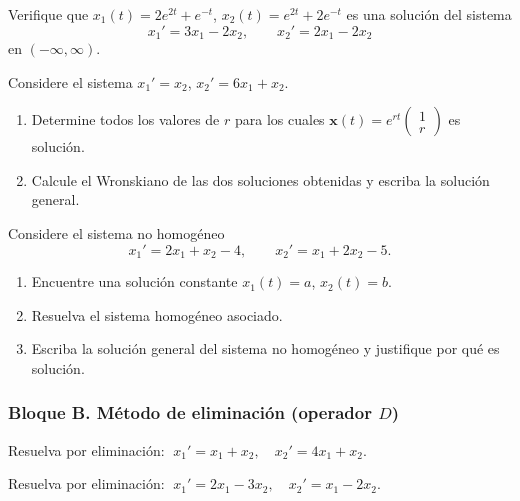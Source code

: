 \begin{exercise}[\est{1}]\label{ex:A2}
Verifique que $x_1(t) = 2e^{2t} + e^{-t}$, $x_2(t) = e^{2t} + 2e^{-t}$ es una solución del sistema
\[
x_1' = 3x_1 - 2x_2, \qquad x_2' = 2x_1 - 2x_2
\]
en $(-\infty,\infty)$.
\end{exercise}

\begin{exercise}[\est{2}]\label{ex:A3}
Considere el sistema $x_1' = x_2$, $x_2' = 6x_1 + x_2$.
\begin{enumerate}[a]
    \item Determine todos los valores de $r$ para los cuales $\mathbf{x}(t) = e^{rt}\begin{pmatrix}1\\ r\end{pmatrix}$ es solución.
    \item Calcule el Wronskiano de las dos soluciones obtenidas y escriba la solución general.
\end{enumerate}
\end{exercise}

\begin{exercise}[\est{2}]\label{ex:A4}
Considere el sistema no homogéneo
\[
x_1' = 2x_1 + x_2 - 4, \qquad x_2' = x_1 + 2x_2 - 5.
\]
\begin{enumerate}[a]
    \item Encuentre una solución constante $x_1(t)=a$, $x_2(t)=b$.
    \item Resuelva el sistema homogéneo asociado.
    \item Escriba la solución general del sistema no homogéneo y justifique por qué es solución.
\end{enumerate}
\end{exercise}

\subsubsection*{Bloque B. Método de eliminación (operador $D$)}

\begin{exercise}[\est{1}]\label{ex:B1}
Resuelva por eliminación: $\;x_1' = x_1 + x_2, \quad x_2' = 4x_1 + x_2.$
\end{exercise}

\begin{exercise}[\est{1}]\label{ex:B2}
Resuelva por eliminación: $\;x_1' = 2x_1 - 3x_2, \quad x_2' = x_1 - 2x_2.$
\end{exercise}

